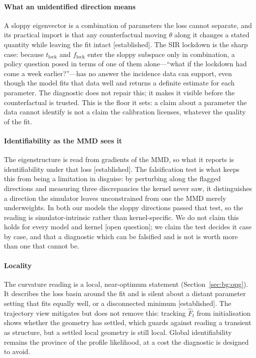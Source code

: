 \documentclass[10pt,twocolumn]{article}
\newcommand{\Fhat}{\hat{F}}
\newcommand{\est}[1]{\textup{\textsf{\footnotesize[#1]}}}
\begin{document}
\paragraph{What an unidentified direction means}
A sloppy eigenvector is a combination of parameters the loss cannot separate, and its
practical import is that any counterfactual moving $\theta$ along it changes a stated
quantity while leaving the fit intact \est{established}. The SIR lockdown is the
sharp case: because $t_{\mathrm{lock}}$ and $f_{\mathrm{lock}}$ enter the sloppy
subspace only in combination, a policy question posed in terms of one of them
alone---``what if the lockdown had come a week earlier?''---has no answer the
incidence data can support, even though the model fits that data well and returns a
definite estimate for each parameter. The diagnostic does not repair this; it makes
it visible before the counterfactual is trusted. This is the floor it sets: a
claim about a parameter the data cannot identify is not a claim the calibration
licenses, whatever the quality of the fit.

\paragraph{Identifiability as the MMD sees it}
The eigenstructure is read from gradients of the MMD, so what it reports is
identifiability under that loss \est{established}. The falsification test is what
keeps this from being a limitation in disguise: by perturbing along the flagged
directions and measuring three discrepancies the kernel never saw, it distinguishes a
direction the simulator leaves unconstrained from one the MMD merely underweights.
In both our models the sloppy directions passed that test, so the reading is
simulator-intrinsic rather than kernel-specific. We do not claim this holds for every
model and kernel \est{open question}; we claim the test decides it case by case, and
that a diagnostic which can be falsified and is not is worth more than one that cannot
be.

\paragraph{Locality}
The curvature reading is a local, near-optimum statement (Section~\ref{sec:bg:opg}).
It describes the loss basin around the fit and is silent about a distant parameter
setting that fits equally well, or a disconnected minimum \est{established}. The
trajectory view mitigates but does not remove this: tracking $\Fhat_t$ from
initialisation shows whether the geometry has settled, which guards against reading a
transient as structure, but a settled local geometry is still local. Global
identifiability remains the province of the profile likelihood, at a cost the
diagnostic is designed to avoid.
\end{document}
